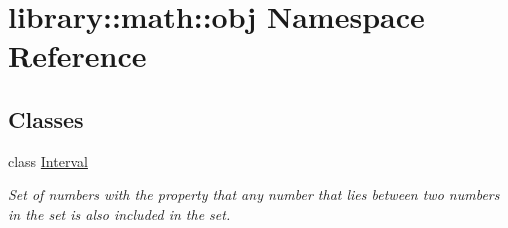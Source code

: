 \hypertarget{namespacelibrary_1_1math_1_1obj}{}\section{library\+:\+:math\+:\+:obj Namespace Reference}
\label{namespacelibrary_1_1math_1_1obj}
\subsection*{Classes}
\begin{DoxyCompactItemize}
\item 
class \hyperlink{classlibrary_1_1math_1_1obj_1_1_interval}{Interval}
\begin{DoxyCompactList}\small\item\em Set of numbers with the property that any number that lies between two numbers in the set is also included in the set. \end{DoxyCompactList}\end{DoxyCompactItemize}
